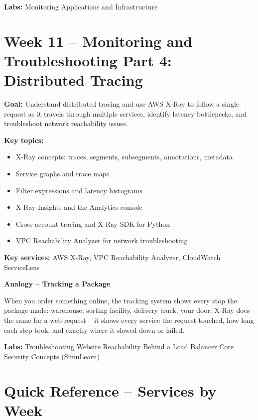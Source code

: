 \documentclass[12pt,a4paper]{article}
\begin{document}
\textbf{Labs:} Monitoring Applications and Infrastructure

\newpage

\section{Week 11 -- Monitoring and Troubleshooting Part 4: Distributed Tracing}

\textbf{Goal:} Understand distributed tracing and use AWS X-Ray to follow a single
request as it travels through multiple services, identify latency bottlenecks, and
troubleshoot network reachability issues.

\textbf{Key topics:}
\begin{itemize}[leftmargin=1.5em]
  \item X-Ray concepts: traces, segments, subsegments, annotations, metadata
  \item Service graphs and trace maps
  \item Filter expressions and latency histograms
  \item X-Ray Insights and the Analytics console
  \item Cross-account tracing and X-Ray SDK for Python
  \item VPC Reachability Analyzer for network troubleshooting
\end{itemize}

\textbf{Key services:} AWS X-Ray, VPC Reachability Analyzer, CloudWatch ServiceLens

\begin{analogybox}
\textbf{Analogy -- Tracking a Package}

When you order something online, the tracking system shows every stop the package
made: warehouse, sorting facility, delivery truck, your door. X-Ray does the same
for a web request -- it shows every service the request touched, how long each step
took, and exactly where it slowed down or failed.
\end{analogybox}

\textbf{Labs:} Troubleshooting Website Reachability Behind a Load Balancer
\textbullet{} Core Security Concepts (SimuLearn)

\newpage

\section*{Quick Reference -- Services by Week}
\end{document}
